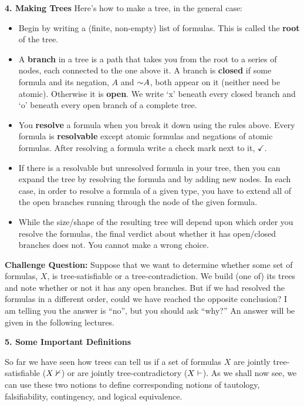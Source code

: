 \documentclass[options]{philosophersimprint}
\begin{document}
\textbf{4. Making Trees} Here's how to make a tree, in the general case:
\begin{itemize}
    \item Begin by writing a (finite, non-empty) list of formulas. This is called the \textbf{root} of the tree.
    \item A \textbf{branch} in a tree is a path that takes you from the root to a series of nodes, each connected to the one above it. A branch is \textbf{closed} if some formula and its negation, $A$ and $\mathord{\sim} A$, both appear on it (neither need be atomic). Otherwise it is \textbf{open}. We write `x' beneath every closed branch and `o' beneath every open branch of a complete tree.
    \item You \textbf{resolve} a formula when you break it down using the rules above. Every formula is \textbf{resolvable} except atomic formulas and negations of atomic formulas. After resolving a formula write a check mark next to it, $\checkmark$.
    \item If there is a resolvable but unresolved formula in your tree, then you can expand the tree by resolving the formula and by adding new nodes. In each case, in order to resolve a formula of a given type, you have to extend all of the open branches running through the node of the given formula.
    \item While the size/shape of the resulting tree will depend upon which order you resolve the formulas, the final verdict about whether it has open/closed branches does not. You cannot make a wrong choice.
\end{itemize}

\textbf{Challenge Question:} Suppose that we want to determine whether some set of formulas, $X$, is tree-satisfiable or a tree-contradiction. We build (one of) its trees and note whether or not it has any open branches. But if we had resolved the formulas in a different order, could we have reached the opposite conclusion? I am telling you the answer is ``no'', but you should ask ``why?'' An answer will be given in the following lectures.

\textbf{5. Some Important Definitions}

So far we have seen how trees can tell us if a set of formulas $X$ are jointly tree-satisfiable ($X\nvdash$) or are jointly tree-contradictory ($X\vdash$). As we shall now see, we can use these two notions to define corresponding notions of tautology, falsifiability, contingency, and logical equivalence.
\end{document}
